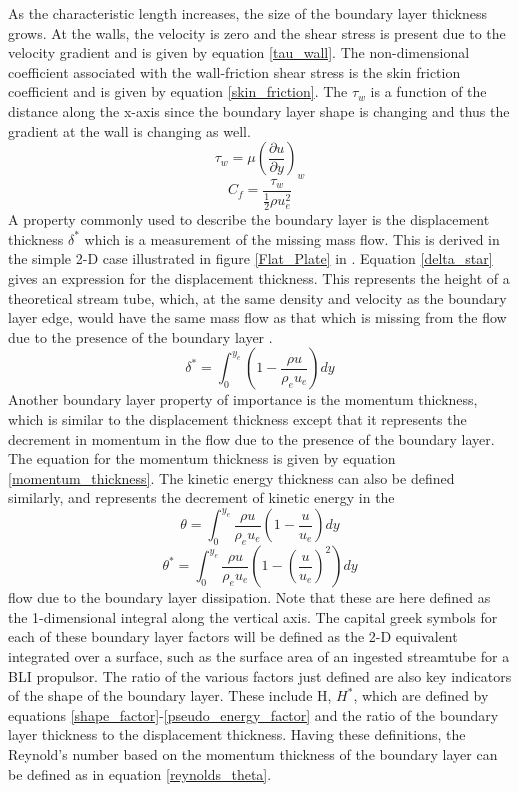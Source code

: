 \documentclass[12pt]{gatech-thesis}
\begin{document}
As the characteristic length increases, the size of the boundary layer thickness grows.  At the walls, the velocity is zero and the shear stress is present due to the velocity gradient and is given by equation \ref{tau_wall}.  The non-dimensional coefficient associated with the wall-friction shear stress is the skin friction coefficient and is given by equation \ref{skin_friction}.   The $\tau_w$ is a function of the distance along the x-axis since the boundary layer shape is changing and thus the gradient at the wall is changing as well.
% 
\begin{equation} \tau_w = \mu \left(\frac{\partial u}{\partial y}\right)_w\label{tau_wall}\end{equation}
\begin{equation} C_f = \frac{\tau_w}{\frac{1}{2}\rho u_e^2}\label{skin_friction}\end{equation}
%
A property commonly used to describe the boundary layer is the displacement thickness $\delta^*$ which is a measurement of the missing mass flow.  This is derived in the simple 2-D case illustrated in figure \ref{Flat_Plate} in \cite{Anderson2001}. Equation \ref{delta_star} gives an expression for the displacement thickness.  This represents the height of a theoretical stream tube, which, at the same density and velocity as the boundary layer edge, would have the same mass flow as that which is missing from the flow due to the presence of the boundary layer \cite{Anderson2001}.
\begin{equation}\delta^* = \int_0^{y_e} \left(1-\frac{\rho u}{\rho_e u_e}\right)dy\label{delta_star}\end{equation}
Another boundary layer property of importance is the momentum thickness, which is similar to the displacement thickness except that it represents the decrement in momentum in the flow due to the presence of the boundary layer.  The equation for the momentum thickness is given by equation \ref{momentum_thickness}.  The kinetic energy thickness can also be defined similarly, and represents the decrement of kinetic energy in the 
\begin{equation}\theta = \int_0^{y_e} \frac{\rho u}{\rho_e u_e}\left(1-\frac{u}{u_e}\right)dy\label{momentum_thickness}\end{equation}
\begin{equation}\theta^* = \int_0^{y_e} \frac{\rho u}{\rho_e u_e}\left(1-\left(\frac{u}{u_e}\right)^2\right)dy\end{equation}
flow due to the boundary layer dissipation.  Note that these are here defined as the 1-dimensional integral along the vertical axis.  The capital greek symbols for each of these boundary layer factors will be defined as the 2-D equivalent integrated over a surface, such as the surface area of an ingested streamtube for a BLI propulsor.  The ratio of the various factors just defined are also key indicators of the shape of the boundary layer.  These include H, $H^*$, which are defined by equations \ref{shape_factor}-\ref{pseudo_energy_factor} and the ratio of the boundary layer thickness to the displacement thickness.  Having these definitions, the Reynold's number based on the momentum thickness of the boundary layer can be defined as in equation \ref{reynolds_theta}.
\end{document}
